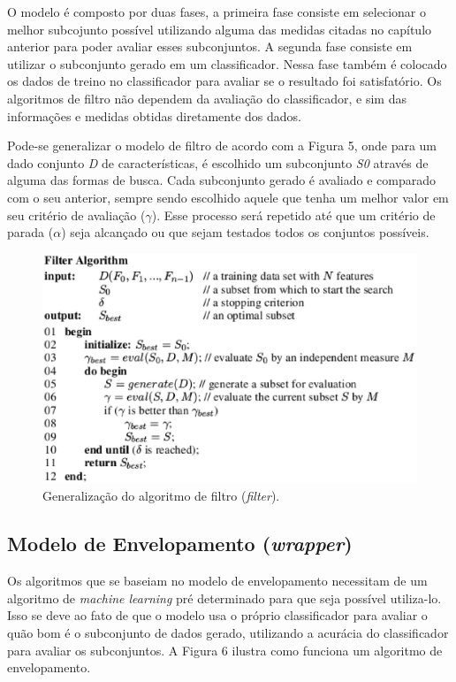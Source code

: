 O modelo é composto por duas fases, a primeira fase consiste em selecionar o melhor subcojunto possível utilizando alguma das medidas citadas no capítulo anterior para poder avaliar esses subconjuntos. A segunda fase consiste em utilizar o subconjunto gerado em um classificador. Nessa fase também é colocado os dados de treino no classificador para avaliar se o resultado foi satisfatório. Os algoritmos de filtro não dependem da avaliação do classificador, e sim das informações e medidas obtidas diretamente dos dados. \cite{huan_1998}

Pode-se generalizar o modelo de filtro de acordo com a Figura 5, onde para um dado conjunto \textit{D} de características, é escolhido um subconjunto \textit{S0} através de alguma das formas de busca. Cada subconjunto gerado é avaliado e comparado com o seu anterior, sempre sendo escolhido aquele que tenha um melhor valor em seu critério de avaliação ($\gamma$). Esse processo será repetido até que um critério de parada ($\alpha$) seja alcançado ou que sejam testados todos os conjuntos possíveis. \cite{liu_2005}

\begin{figure}[h]
	\centering
	\label{fig06}
		\includegraphics[keepaspectratio=true,scale=0.7]{figuras/fig07.eps}
	\caption{Generalização do algoritmo de filtro (\textit{filter}). \cite{liu_2005}}
\end{figure}

\subsection{Modelo de Envelopamento (\textit{wrapper})}

Os algoritmos que se baseiam no modelo de envelopamento necessitam de um algoritmo de \textit{machine learning} pré determinado para que seja possível utiliza-lo. Isso se deve ao fato de que o modelo usa o próprio classificador para avaliar o quão bom é o subconjunto de dados gerado, utilizando a acurácia do classificador para avaliar os subconjuntos. A Figura 6 ilustra como funciona um algoritmo de envelopamento.

